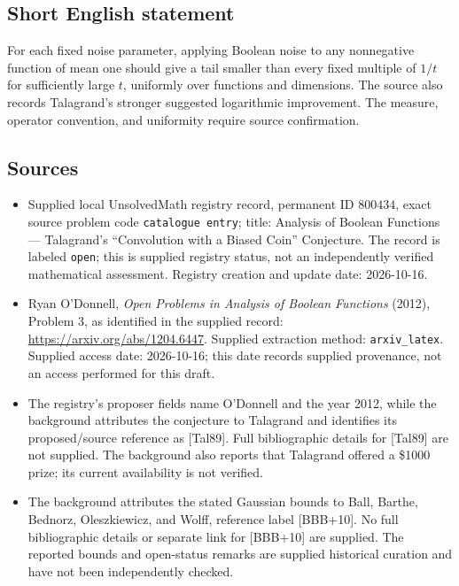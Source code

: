 \documentclass[11pt]{article}
\begin{document}
\subsection{Short English statement}
For each fixed noise parameter, applying Boolean noise to any nonnegative function of mean one should give a tail smaller than every fixed multiple of \(1/t\) for sufficiently large \(t\), uniformly over functions and dimensions. The source also records Talagrand's stronger suggested logarithmic improvement. The measure, operator convention, and uniformity require source confirmation.
\subsection{Sources}
\begin{itemize}
\item Supplied local UnsolvedMath registry record, permanent ID \(800434\), exact source problem code \texttt{catalogue entry}; title: Analysis of Boolean Functions --- Talagrand's ``Convolution with a Biased Coin'' Conjecture. The record is labeled \texttt{open}; this is supplied registry status, not an independently verified mathematical assessment. Registry creation and update date: 2026-10-16.
\item Ryan O'Donnell, \emph{Open Problems in Analysis of Boolean Functions} (2012), Problem 3, as identified in the supplied record: \url{https://arxiv.org/abs/1204.6447}. Supplied extraction method: \texttt{arxiv\_latex}. Supplied access date: 2026-10-16; this date records supplied provenance, not an access performed for this draft.
\item The registry's proposer fields name O'Donnell and the year 2012, while the background attributes the conjecture to Talagrand and identifies its proposed/source reference as [Tal89]. Full bibliographic details for [Tal89] are not supplied. The background also reports that Talagrand offered a \$1000 prize; its current availability is not verified.
\item The background attributes the stated Gaussian bounds to Ball, Barthe, Bednorz, Oleszkiewicz, and Wolff, reference label [BBB+10]. No full bibliographic details or separate link for [BBB+10] are supplied. The reported bounds and open-status remarks are supplied historical curation and have not been independently checked.
\end{itemize}
\end{document}
